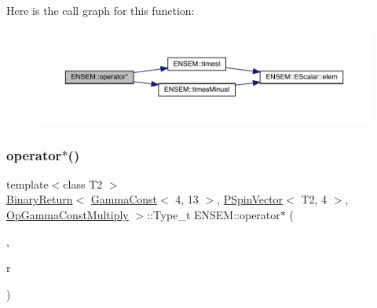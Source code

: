 Here is the call graph for this function\+:\nopagebreak
\begin{figure}[H]
\begin{center}
\leavevmode
\includegraphics[width=350pt]{dd/d6d/group__primspinvector_gacda74bfacd9c872e7d821f2355890a01_cgraph}
\end{center}
\end{figure}
\mbox{\label{group__primspinvector_ga7295695be69d983ea6fd8d3710a448d7}} 
\subsubsection{\texorpdfstring{operator$\ast$()}{operator*()}\hspace{0.1cm}{\footnotesize\ttfamily [14/32]}}
{\footnotesize\ttfamily template$<$class T2 $>$ \\
\mbox{\hyperlink{structENSEM_1_1BinaryReturn}{Binary\+Return}}$<$ \mbox{\hyperlink{classENSEM_1_1GammaConst}{Gamma\+Const}}$<$ 4, 13 $>$, \mbox{\hyperlink{classENSEM_1_1PSpinVector}{P\+Spin\+Vector}}$<$ T2, 4 $>$, \mbox{\hyperlink{structENSEM_1_1OpGammaConstMultiply}{Op\+Gamma\+Const\+Multiply}} $>$\+::Type\+\_\+t E\+N\+S\+E\+M\+::operator$\ast$ (\begin{DoxyParamCaption}\item[{const \mbox{\hyperlink{classENSEM_1_1GammaConst}{Gamma\+Const}}$<$ 4, 13 $>$ \&}]{,  }\item[{const \mbox{\hyperlink{classENSEM_1_1PSpinVector}{P\+Spin\+Vector}}$<$ T2, 4 $>$ \&}]{r }\end{DoxyParamCaption})\hspace{0.3cm}{\ttfamily [inline]}}

\mbox{\label{group__primspinvector_ga890c8e465f4d1855cc9aa62f066b5679}} 
